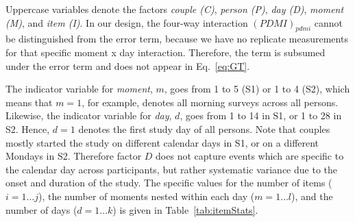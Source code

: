 \documentclass[jou,a4paper,draftfirst]{apa6}\usepackage[]{graphicx}\usepackage[]{color}
\begin{document}
Uppercase variables denote the factors \emph{couple (C)}, \emph{person (P)}, \emph{day (D)}, \emph{moment (M)}, and \emph{item (I)}.
In our design, the four-way interaction $(PDMI)_{pdmi}$ cannot be distinguished from the error term, because we have no replicate measurements for that specific moment x day interaction. Therefore, the term is subsumed under the error term and does not appear in Eq.~\eqref{eq:GT}. 

The indicator variable for \emph{moment}, $m$, goes from 1 to 5 (S1) or 1 to 4 (S2), which means that $m = 1$, for example, denotes all morning surveys across all persons. Likewise, the indicator variable for \emph{day}, $d$, goes from 1 to 14 in S1, or 1 to 28 in S2. Hence, $d = 1$ denotes the first study day of all persons. Note that couples mostly started the study on different calendar days in S1, or on a different Mondays in S2.  Therefore factor $D$ does not capture events which are specific to the calendar day across participants, but rather systematic variance due to the onset and duration of the study. 
The specific values for the number of items ($i = 1 \dots j$), the number of moments nested within each day ($m = 1 \dots l$), and the number of days ($d = 1 \dots k$) is given in Table~\ref{tab:itemStats}.

%
%
%
%
%
%
%
\end{document}
